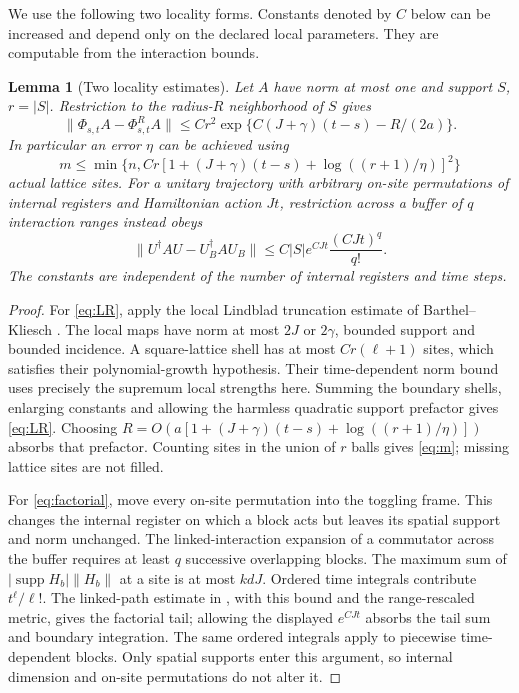 \documentclass[11pt,reqno]{amsart}
\numberwithin{equation}{section}
\newtheorem{lemma}[theorem]{Lemma}
\theoremstyle{definition}
\theoremstyle{remark}
\newcommand{\supp}{\operatorname{supp}}
\newcommand{\nn}[1]{\lVert#1\rVert}
\begin{document}
We use the following two locality forms. Constants denoted by $C$ below can be increased and depend only on the declared local parameters. They are computable from the interaction bounds.

\begin{lemma}[Two locality estimates]\label{lem:locality}
Let $A$ have norm at most one and support $S$, $r=|S|$. Restriction to the radius-$R$ neighborhood of $S$ gives
\begin{equation}\label{eq:LR}
 \nn{\Phi_{s,t}A-\Phi^{R}_{s,t}A}
 \leq Cr^2\exp\{C(J+\gamma)(t-s)-R/(2a)\}.
\end{equation}
In particular an error $\eta$ can be achieved using
\begin{equation}\label{eq:m}
 m\leq\min\{n,Cr[1+(J+\gamma)(t-s)+\log((r+1)/\eta)]^2\}
\end{equation}
actual lattice sites. For a unitary trajectory with arbitrary on-site permutations of internal registers and Hamiltonian action $Jt$, restriction across a buffer of $q$ interaction ranges instead obeys
\begin{equation}\label{eq:factorial}
 \nn{U^\dagger A U-U_B^\dagger A U_B}
 \leq C |S|e^{CJt}\frac{(CJt)^q}{q!}.
\end{equation}
The constants are independent of the number of internal registers and time steps.
\end{lemma}
\begin{proof}
For \eqref{eq:LR}, apply the local Lindblad truncation estimate of Barthel--Kliesch \cite[Theorems~1--2]{BK}. The local maps have norm at most $2J$ or $2\gamma$, bounded support and bounded incidence. A square-lattice shell has at most $Cr(\ell+1)$ sites, which satisfies their polynomial-growth hypothesis. Their time-dependent norm bound uses precisely the supremum local strengths here. Summing the boundary shells, enlarging constants and allowing the harmless quadratic support prefactor gives \eqref{eq:LR}. Choosing $R=O(a[1+(J+\gamma)(t-s)+\log((r+1)/\eta)])$ absorbs that prefactor. Counting sites in the union of $r$ balls gives \eqref{eq:m}; missing lattice sites are not filled.

For \eqref{eq:factorial}, move every on-site permutation into the toggling frame. This changes the internal register on which a block acts but leaves its spatial support and norm unchanged. The linked-interaction expansion of a commutator across the buffer requires at least $q$ successive overlapping blocks. The maximum sum of $|\supp H_b|\nn{H_b}$ at a site is at most $kdJ$. Ordered time integrals contribute $t^\ell/\ell!$. The linked-path estimate in \cite[Lemma~5, Appendix~C.4, (48)--(49)]{HHKL}, with this bound and the range-rescaled metric, gives the factorial tail; allowing the displayed $e^{CJt}$ absorbs the tail sum and boundary integration. The same ordered integrals apply to piecewise time-dependent blocks. Only spatial supports enter this argument, so internal dimension and on-site permutations do not alter it.
\end{proof}
\end{document}
